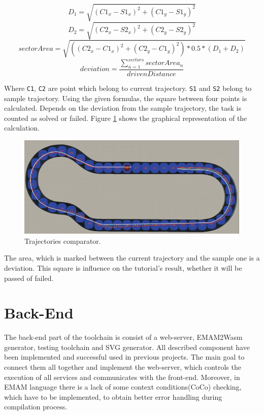 \begin{equation}
    D_1 = \sqrt{(C1_x - S1_x)^2 + (C1_y - S1_y)^2}
\end{equation}
\begin{equation}
    D_2 = \sqrt{(C2_x - S2_x)^2 + (C2_y - S2_y)^2}
\end{equation}
\begin{equation}
    sectorArea = \sqrt{((C2_x - C1_x)^2 + (C2_y - C1_y)^2) * 0.5 * (D_1 + D_2)}
\end{equation}
\begin{equation}
    deviation = \frac{\sum_{n=1}^{sectors} sectorArea_n}{drivenDistance}
\end{equation}

Where \texttt{C1}, \texttt{C2} are point which belong to current trajectory. \texttt{S1} and \texttt{S2} belong to sample trajectory. Using the given formulas, the square between four points is calculated. Depends on the deviation from the sample trajectory, the task is counted as solved or failed. Figure \ref{fig:trajectory-comparator} shows the graphical representation of the calculation.
\begin{figure}[ht!]
    \centering
    \includegraphics[width=\linewidth]{src/pic/trajectory-comparison}
    \caption{Trajectories comparator.}
    \label{fig:trajectory-comparator}
\end{figure} \newline
The area, which is marked between the current trajectory and the sample one is a deviation. This square is influence on the tutorial's result, whether it will be passed of failed.

\section{Back-End}
The back-end part of the toolchain is consist of a web-server, EMAM2Wasm generator, testing toolchain and SVG generator. All described component have been implemented and successful used in previous projects. The main goal to connect them all together and implement the web-server, which controls the execution of all services and communicates with the front-end. Moreover, in EMAM language there is a lack of some context conditions(CoCo) checking, which have to be implemented, to obtain better error handling during compilation process.

